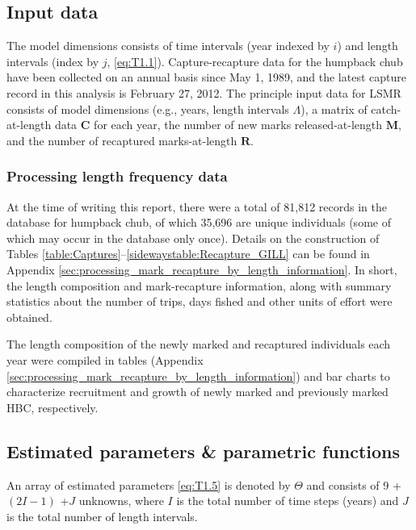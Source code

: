 \subsection{Input data} %
\label{sub:input_data}
The model dimensions consists of time intervals (year indexed by $i$) and length intervals (index by $j$, \ref{eq:T1.1}).  Capture-recapture data for the humpback chub have been collected on an annual basis since May 1, 1989,  and the latest capture record in this analysis is February 27, 2012.  The principle input data for LSMR consists of model dimensions (e.g., years, length intervals $\Lambda$), a matrix of catch-at-length data $\mathbf{C}$ for each year, the number of new marks released-at-length $\mathbf{M}$, and the number of recaptured marks-at-length $\mathbf{R}$.


\subsubsection{Processing length frequency data} %
\label{ssub:processing_length_frequency_data}
At the time of writing this report, there were a total of 81,812 records in the database for humpback chub, of which 35,696 are unique individuals (some of which may occur in the database only once).  Details on the construction of Tables \ref{table:Captures}--\ref{sidewaystable:Recapture_GILL} can be found in Appendix \ref{sec:processing_mark_recapture_by_length_information}. In short, the length composition and mark-recapture information, along with summary statistics about the number of trips, days fished and other units of effort were obtained.

The length composition of the newly marked and recaptured individuals each year were compiled in tables (Appendix \ref{sec:processing_mark_recapture_by_length_information}) and bar charts to characterize recruitment and growth of newly marked and previously marked HBC, respectively.

\subsection{Estimated parameters \& parametric functions} %
\label{sub:estimated_parameters}
An array of estimated parameters \eqref{eq:T1.5} is denoted by $\Theta$ and consists of 9 +$(2I-1)$ +$J$ unknowns, where $I$ is the total number of time steps (years) and $J$ is the total number of length intervals.  

